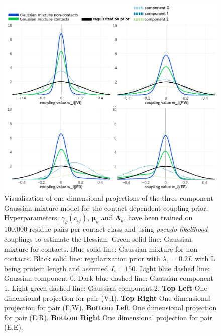 \documentclass[11pt,a4paper,twoside]{book}
\newcommand{\eq}{\!=\!}
\newcommand{\Lk}{\mathbf{\Lambda}_k}
\newcommand{\muk}{\mathbf{\mu}_k}
\newcommand{\cij}{c_{ij}}
\theoremstyle{definition}
\theoremstyle{definition}
\theoremstyle{remark}
\begin{document}
\begin{figure}
\includegraphics[width=1\linewidth]{img/bayesian_model/pll/3/1dvis_combined} \caption{Visualisation of one-dimensional
projections of the three-component Gaussian mixture model for the
contact-dependent coupling prior. Hyperparameters, \(\gamma_k(\cij)\),
\(\muk\) and \(\Lk\), have been trained on 100,000 residue pairs per
contact class and using \emph{pseudo-likelihood} couplings to estimate
the Hessian. Green solid line: Gaussian mixture for contacts. Blue solid
line: Gaussian mixture for non-contacts. Black solid line:
regularization prior with \(\lambda_1 \eq 0.2L\) with L being protein
length and assumed \(L\eq150\). Light blue dashed line: Gaussian
component 0. Dark blue dashed line: Gaussian component 1. Light green
dashed line: Gaussian component 2. \textbf{Top Left} One dimensional
projection for pair (V,I). \textbf{Top Right} One dimensional projection
for pair (F,W). \textbf{Bottom Left} One dimensional projection for pair
(E,R). \textbf{Bottom Right} One dimensional projection for pair (E,E).}\label{fig:vis1d-pll-3comp-100k}
\end{figure}
\end{document}
